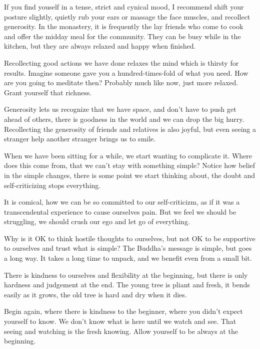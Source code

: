 If you find youself in a tense, strict and cynical mood, I recommend
shift your posture slightly, quietly rub your ears or massage the face
muscles, and recollect generosity. In the monastery, it is frequently
the lay friends who come to cook and offer the midday meal for the
community. They can be busy while in the kitchen, but they are always
relaxed and happy when finished.

Recollecting good actions we have done relaxes the mind which is thirsty
for results. Imagine someone gave you a hundred-times-fold of what you
need. How are you going to meditate then? Probably much like now, just
more relaxed. Grant yourself that richness.

Generosity lets us recognize that we have space, and don't have to push
get ahead of others, there is goodness in the world and we can drop the
big hurry. Recollecting the generosity of friends and relatives is also
joyful, but even seeing a stranger help another stranger brings us to
smile.

When we have been sitting for a while, we start wanting to complicate
it. Where does this come from, that we can't stay with something simple?
Notice how belief in the simple changes, there is some point we start
thinking about, the doubt and self-criticizing stops everything.

It is comical, how we can be so committed to our self-criticizm, as if
it was a transcendental experience to cause ourselves pain. But we feel
we should be struggling, we should crush our ego and let go of
everything.

Why is it OK to think hostile thoughts to ourselves, but not OK to be
supportive to ourselves and trust what is simple? The Buddha's message
is simple, but goes a long way. It takes a long time to unpack, and we
benefit even from a small bit.

There is kindness to ourselves and flexibility at the beginning, but
there is only hardness and judgement at the end. The young tree is
pliant and fresh, it bends easily as it grows, the old tree is hard and
dry when it dies.

Begin again, where there is kindness to the beginner, where you didn't
expect yourself to know. We don't know what is here until we watch and
see. That seeing and watching is the fresh knowing. Allow yourself to be
always at the beginning.
